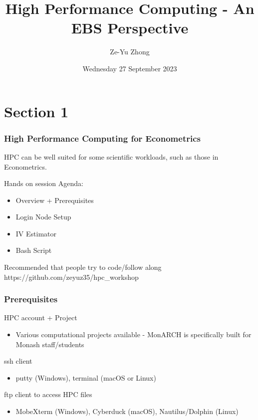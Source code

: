\documentclass[aspectratio=169,notheorems]{beamer}
\title{High Performance Computing - An EBS Perspective}
\author[]{Ze-Yu Zhong
}
\date{Wednesday 27 September 2023}
\theoremstyle{plain}
\theoremstyle{plain}
\numberwithin{equation}{section}
\begin{document}
\begin{frame}
\titlepage
\end{frame}

\section{Section 1}
\begin{frame}
\frametitle{High Performance Computing for Econometrics}
HPC can be well suited for some scientific workloads, such as those in Econometrics.

\medskip
Hands on session Agenda:
\begin{itemize}
\item Overview + Prerequisites
\item Login Node Setup
\item IV Estimator
\item Bash Script
\end{itemize}
Recommended that people try to code/follow along
\medskip
https://github.com/zeyuz35/hpc\_workshop
\end{frame}

\begin{frame}
\frametitle{Prerequisites}
HPC account + Project
\begin{itemize}
\item Various computational projects available - MonARCH is specifically built for Monash staff/students
\end{itemize}
ssh client
\begin{itemize}
\item putty (Windows), terminal (macOS or Linux)
\end{itemize}
ftp client to access HPC files
\begin{itemize}
\item MobeXterm (Windows), Cyberduck (macOS), Nautilus/Dolphin (Linux)
\end{itemize}
\end{frame}
\end{document}
